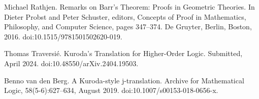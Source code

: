 \par\noindent  [20]  Michael Rathjen.  Remarks on Barr’s Theorem: Proofs in Geometric Theories.  In Dieter Probst and Peter Schuster, editors, Concepts of Proof in Mathematics, Philosophy, and Computer Science, pages 347–374. De Gruyter, Berlin, Boston, 2016.  doi:10.1515/9781501502620-019.  
 
\par\noindent  [21]  Thomas Traversié.  Kuroda’s Translation for Higher-Order Logic.  Submitted, April 2024.  doi:10.48550/arXiv.2404.19503.  
 
\par\noindent  [22]  Benno van den Berg.  A Kuroda-style j-translation.  Archive for Mathematical Logic, 58(5-6):627–634, August 2019.  doi:10.1007/s00153-018-0656-x.  
  
